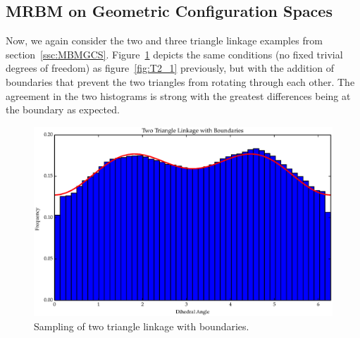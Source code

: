 \subsection{MRBM on Geometric Configuration Spaces}
Now, we again consider the two and three triangle linkage examples from section~\ref{ssc:MBMGCS}. Figure~\ref{fig:T2_2} depicts the same conditions (no fixed trivial degrees of freedom) as figure~\ref{fig:T2_1} previously, but with the addition of boundaries that prevent the two triangles from rotating through each other. The agreement in the two histograms is strong with the greatest differences being at the boundary as expected. 
\begin{figure}[ht]
\label{fig:T2_2}
\centering
  \includegraphics[scale=0.6]{images/T2_2.eps}
\caption{Sampling of two triangle linkage with boundaries.}
\end{figure}

